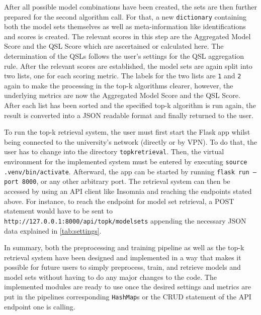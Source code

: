 After all possible model combinations have been created, the sets are then further prepared for the second algorithm call. For that, a new \texttt{dictionary} containing both the model sets themselves as well as meta-information like identifications and scores is created. The relevant scores in this step are the Aggregated Model Score and the QSL Score which are ascertained or calculated here. The determination of the QSLs follows the user's settings for the QSL aggregation rule. After the relevant scores are established, the model sets are again split into two lists, one for each scoring metric. The labels for the two lists are \texttt{1} and \texttt{2} again to make the processing in the top-k algorithms clearer, however, the underlying metrics are now the Aggregated Model Score and the QSL Score. After each list has been sorted and the specified top-k algorithm is run again, the result is converted into a JSON readable format and finally returned to the user.


To run the top-k retrieval system, the user must first start the Flask app whilst being connected to the university's network (directly or by VPN). To do that, the user has to change into the directory \texttt{topkretrieval}. Then, the virtual environment for the implemented system must be entered by executing \texttt{source .venv/bin/activate}. Afterward, the app can be started by running \texttt{flask run --port 8000}, or any other arbitrary port. The retrieval system can then be accessed by using an API client like Insomnia and reaching the endpoints stated above. For instance, to reach the endpoint for model set retrieval, a POST statement would have to be sent to \texttt{http://127.0.0.1:8000/api/topk/modelsets} appending the necessary JSON data explained in \autoref{tab:settings}.

In summary, both the preprocessing and training pipeline as well as the top-k retrieval system have been designed and implemented in a way that makes it possible for future users to simply preprocess, train, and retrieve models and model sets without having to do any major changes to the code. The implemented modules are ready to use once the desired settings and metrics are put in the pipelines corresponding \texttt{HashMap}s or the CRUD statement of the API endpoint one is calling.

